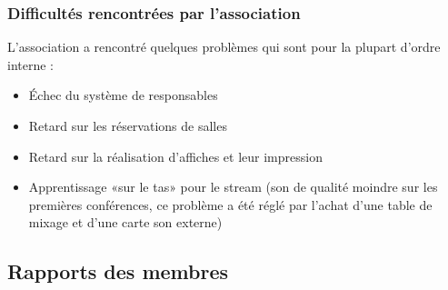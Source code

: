 \documentclass[12pt]{report}
\begin{document}
    \subsection{Difficultés rencontrées par l'association}
    L'association a rencontré quelques problèmes qui sont pour la plupart
    d'ordre interne :\\
    \begin{itemize}
            \item Échec du système de responsables 
            \item Retard sur les réservations de salles
            \item Retard sur la réalisation d'affiches et leur impression
            \item Apprentissage «sur le tas» pour le stream (son de qualité
                    moindre sur les premières conférences, ce problème a été
                    réglé par l'achat d'une table de mixage et d'une carte son
                    externe)
    \end{itemize}
  \begin{appendices}
    \chapter{Rapports des membres}
    
    
    
    
  \end{appendices}
\end{document}
